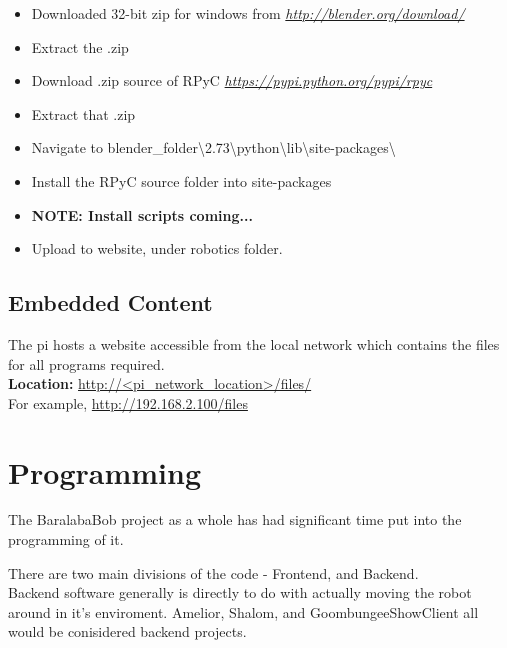 				\begin{itemize}
					\item Downloaded 32-bit zip for windows from \emph{\url{http://blender.org/download/}}
					\item Extract the .zip
					\item Download .zip source of RPyC \emph{\url{https://pypi.python.org/pypi/rpyc}}
					\item Extract that .zip
					\item Navigate to blender\_folder\textbackslash 2.73\textbackslash python\textbackslash lib\textbackslash site-packages\textbackslash
					\item Install the RPyC source folder into site-packages
					\item \textbf{NOTE: Install scripts coming...}
					\item Upload to website, under robotics folder.
				\end{itemize}
				
				\pagebreak
	
	
		\section{Embedded Content}
			The pi hosts a website accessible from the local network which contains the files for all programs required.\\
			
			\textbf{Location:} \url{http://<pi_network_location>/files/}\\
			
			For example, \url{http://192.168.2.100/files}
			\pagebreak



	\chapter{Programming}
		The BaralabaBob project as a whole has had significant time put into the programming of it.
		
		There are two main divisions of the code - Frontend, and Backend. \\
		
		Backend software generally is directly to do with actually moving the robot around in it's enviroment. Amelior, Shalom, and GoombungeeShowClient all would be conisidered backend projects.\\
		
